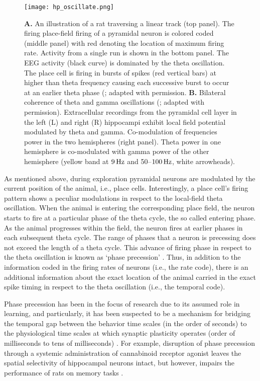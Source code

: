     \begin{figure}
      \center
      \texttt{[image: hp\_oscillate.png]}
      \caption{
        {\bf A.} An illustration of a rat traversing a linear track (top panel). The
        firing place-field firing of a pyramidal neuron is colored coded
        (middle panel) with red denoting the location of maximum firing rate.
        Activity from a single run is shown in the bottom panel. The EEG activity
        (black curve) is dominated by the theta oscillation. The place cell is
        firing in bursts of spikes (red vertical bars) at higher than theta
        frequency causing each successive burst to occur at an earlier theta
        phase (\citealp{Huxter2003}; adapted with permission.
        {\bf B.} Bilateral coherence of theta and gamma oscillations
        (\citealp{Buzsaki2003}; adapted with permission).  Extracellular
        recordings from the pyramidal cell layer in the left (L) and right (R)
        hippocampi exhibit local field potential modulated by theta and gamma.
        Co-modulation of frequencies power in the two hemispheres (right
        panel). Theta power in one hemisphere is co-modulated with gamma power
        of the other hemisphere (yellow band at $9\,\rm Hz$ and 50--$100\, \rm
        Hz$, white arrowheads).
             }
    \label{fig:hp_oscillate}
    \end{figure}

    As mentioned above, during exploration pyramidal neurons are modulated by
    the current position of the animal, i.e., place cells. Interestingly, a
    place cell's firing pattern shows a peculiar modulations in respect to the
    local-field theta oscillation. When the animal is entering the
    corresponding place field, the neuron starts to fire at a particular phase
    of the theta cycle, the so called entering phase. As the animal progresses
    within the field, the neuron fires at earlier phases in each subsequent
    theta cycle. The range of phases that a neuron is precessing does not
    exceed the length of a theta cycle. This advance of firing phase in respect
    to the theta oscillation is known as `phase precession' \citep{OKeefe1993}.
    Thus, in addition to the information coded in the firing rates of neurons
    (i.e., the rate code), there is an additional information about the exact
    location of the animal carried in the exact spike timing in respect to the
    theta oscillation (i.e., the temporal code).
    
    Phase precession has been in the focus of research due to its assumed role
    in learning, and particularly, it has been suspected to be a mechanism for
    bridging the temporal gap between the behavior time scales (in the order of
    seconds) to the physiological time scales at which synaptic plasticity
    operates (order of milliseconds to tens of milliseconds) \citep{Bi1998}. For
    example, disruption of phase precession through a systemic administration
    of cannabinoid receptor agonist leaves the spatial selectivity of
    hippocampal neurons intact, but however, impairs the performance of rats on
    memory tasks \citep{Robbe2009}.
    
